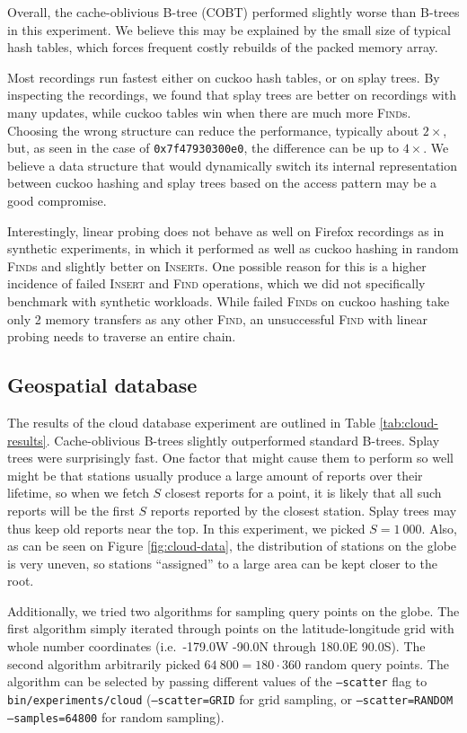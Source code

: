 Overall, the cache-oblivious B-tree (COBT) performed slightly worse than
B-trees in this experiment. We believe this may be explained by the small size
of typical hash tables, which forces frequent costly rebuilds of the packed
memory array.

Most recordings run fastest either on cuckoo hash tables, or on splay trees.
By inspecting the recordings, we found that splay trees are better on recordings
with many updates, while cuckoo tables win when there are much more
\textsc{Find}s. Choosing the wrong structure can reduce the performance,
typically about $2\times$, but, as seen in the case of \texttt{0x7f47930300e0},
the difference can be up to $4\times$.
We believe a data structure that would dynamically switch
its internal representation between cuckoo hashing and splay trees
based on the access pattern may be a good compromise.

Interestingly, linear probing does not behave as well on Firefox recordings
as in synthetic experiments, in which it performed as well as cuckoo hashing
in random \textsc{Find}s and slightly better on \textsc{Insert}s. One possible
reason for this is a higher incidence of failed \textsc{Insert} and
\textsc{Find} operations, which we did not specifically benchmark with
synthetic workloads. While failed \textsc{Find}s on cuckoo hashing take only
2 memory transfers as any other \textsc{Find}, an unsuccessful \textsc{Find}
with linear probing needs to traverse an entire chain.

\subsection{Geospatial database}
The results of the cloud database experiment are outlined in Table
\ref{tab:cloud-results}. Cache-oblivious B-trees slightly outperformed
standard B-trees. Splay trees were surprisingly fast. One factor that might
cause them to perform so well might be that stations usually produce a large
amount of reports over their lifetime, so when we fetch $S$ closest reports
for a point, it is likely that all such reports will be the first $S$ reports
reported by the closest station. Splay trees may thus keep old reports
near the top. In this experiment, we picked $S=1~000$. Also, as can be
seen on Figure \ref{fig:cloud-data}, the distribution of stations on the globe
is very uneven, so stations ``assigned'' to a large area can be kept closer to
the root.

Additionally, we tried two algorithms for sampling query points on the globe.
The first algorithm simply iterated through points on the latitude-longitude
grid with whole number coordinates (i.e.\ -179.0\textdegree W -90.0\textdegree N
through 180.0\textdegree E 90.0\textdegree S).
The second algorithm arbitrarily picked $64~800=180\cdot 360$ random query
points.
The algorithm can be selected by passing different values of the
\texttt{--scatter} flag to \texttt{bin/experiments/cloud}
(\texttt{--scatter=GRID} for grid sampling, or \texttt{--scatter=RANDOM
--samples=64800} for random sampling).

